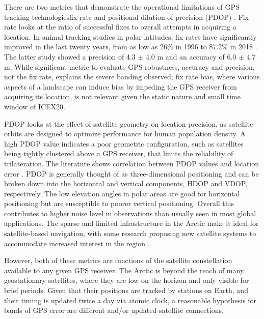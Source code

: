 There are two metrics that demonstrate the operational limitations of GPS tracking technologies\textemdash fix rate and positional dilution of precision (PDOP) \citep{swanlund_gps_2016}.
Fix rate looks at the ratio of successful fixes to overall attempts in acquiring a location.
In animal tracking studies in polar latitudes, fix rates have significantly improved in the last twenty years, from as low as 26\% in 1996 \citep{moen_effects_1996} to 87.2\% in 2018 \citep{jung_accuracy_2018}.
The latter study showed a precision of 4.3 $\pm$ 4.0 m and an accuracy of 6.0 $\pm$ 4.7 m.
While significant metric to evaluate GPS robustness, accuracy and precision, not the fix rate, explains the severe banding observed; fix rate bias, where various aspects of a landscape can induce bias by impeding the GPS receiver from acquiring its location, is not relevant given the static nature and small time window of ICEX20.

PDOP looks at the effect of satellite geometry on location precision, as satellite orbits are designed to optimize performance for human population density.
A high PDOP value indicates a poor geometric configuration, such as satellites being tightly clustered above a GPS receiver, that limits the reliability of trilateration.
The literature shows correlation between PDOP values and location error \citep{swanlund_gps_2016}.
PDOP is generally thought of as three-dimensional positioning and can be broken down into the horizontal and vertical components, HDOP and VDOP, respectively.
The low elevation angles in polar areas are good for horizontal positioning but are susceptible to poorer vertical positioning.
Overall this contributes to higher noise level in observations than usually seen in most global applications.
The sparse and limited infrastructure in the Arctic make it ideal for satellite-based navigation, with some research proposing new satellite systems to accommodate increased interest in the region \citep{reid_gnss_2016}.

However, both of these metrics are functions of the satellite constellation available to any given GPS receiver.
The Arctic is beyond the reach of many geostationary satellites, where they are low on the horizon and only visible for brief periods.
Given that their positions are tracked by stations on Earth, and their timing is updated twice a day via atomic clock, a reasonable hypothesis for bands of GPS error are different and/or updated satellite connections.

